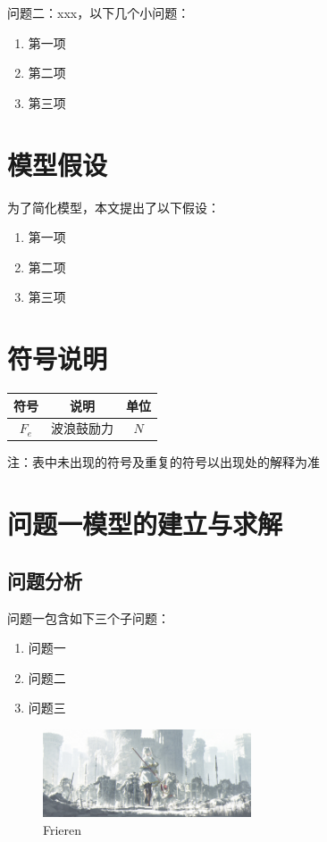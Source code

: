 \documentclass[12pt,a4paper]{article}
\numberwithin{figure}{subsection}
\numberwithin{figure}{subsection}
\begin{document}
问题二：xxx，以下几个小问题：
\begin{enumerate}[itemsep=-0.2em,topsep=0em]
  \item 第一项
  \item 第二项
  \item 第三项
\end{enumerate}

\section{模型假设}
为了简化模型，本文提出了以下假设：
\begin{enumerate}[itemsep=-0.2em,topsep=0em]
  \item 第一项
  \item 第二项
  \item 第三项
\end{enumerate}

\section{符号说明}
\vspace{-2em}

\begin{table}[H]
  \centering%
  \begin{tabular}{ccc}
  \toprule%
  符号&说明&单位\\
  \midrule%
  $F_e$ & 波浪鼓励力 & $N$ \\
  \bottomrule%
  \end{tabular}
\end{table}

注：表中未出现的符号及重复的符号以出现处的解释为准
\section{问题一模型的建立与求解}
\subsection{问题分析}
问题一包含如下三个子问题：
\begin{enumerate}[itemsep=-0.2em,topsep=0em]
  \item 问题一
  \item 问题二
  \item 问题三
\end{enumerate}
\begin{figure}[H]%
  \centering
  \includegraphics[width = 0.55\textwidth]{figures/Frieren.jpg}
  \caption{Frieren}
  \label{img:Frieren}    
\end{figure}
\end{document}
